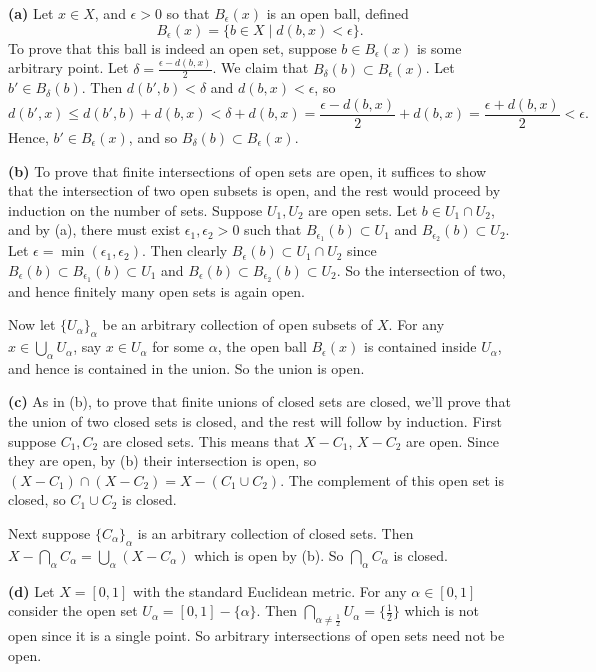 \documentclass[11pt,letterpaper]{article}
\begin{document}
\begin{changemargin}{1em}{1em}
    \textbf{(a)} Let $x\in X$, and $\epsilon > 0$ so that $B_\epsilon(x)$ is an open ball, defined
    \[
        B_\epsilon(x) = \{b\in X \mid d(b,x) < \epsilon\}
    .\] 
    To prove that this ball is indeed an open set, suppose $b\in B_\epsilon(x)$ is some arbitrary point. Let $\delta = \frac{\epsilon - d(b,x)}{2}$. We claim that $B_\delta(b)\subset B_\epsilon(x)$.
    Let $b'\in B_\delta(b)$. Then  $d(b', b)< \delta$ and  $d(b, x) < \epsilon$, so
     \[
        d(b', x)\leq d(b', b) + d(b, x) < \delta + d(b,x) = \frac{\epsilon - d(b,x)}{2} + d(b,x) = \frac{\epsilon + d(b,x)}{2} < \epsilon
    .\] 
    Hence, $b'\in B_\epsilon(x)$, and so  $B_{\delta}(b)\subset B_\epsilon(x)$.

    \textbf{(b)} To prove that finite intersections of open sets are open, it suffices to show that the intersection of two open subsets is open, and the rest would proceed by induction on the number of sets. 
    Suppose $U_1, U_2$ are open sets. Let $b\in U_1\cap U_2$, and by (a), there must exist $\epsilon_1, \epsilon_2 > 0$ such that $B_{\epsilon_1}(b)\subset U_1$ and $B_{\epsilon_2}(b)\subset U_2$. 
    Let  $\epsilon = \min(\epsilon_1, \epsilon_2)$. 
    Then clearly $B_\epsilon(b)\subset U_1\cap U_2$ since  $B_\epsilon(b)\subset B_{\epsilon_1}(b)\subset U_1$ and  $B_\epsilon(b)\subset B_{\epsilon_2}(b)\subset U_2$. 
    So the intersection of two, and hence finitely many open sets is again open.

    Now let $\{U_\alpha\}_\alpha$ be an arbitrary collection of open subsets of $X$. 
    For any $x\in \bigcup_{\alpha}U_\alpha$, say  $x\in U_\alpha$ for some $\alpha$, the open ball $B_\epsilon(x)$ is contained inside  $U_\alpha$, and hence is contained in the union. So the union is open.

    \textbf{(c)} As in (b), to prove that finite unions of closed sets are closed, we'll prove that the union of two closed sets is closed, and the rest will follow by induction. 
    First suppose $C_1, C_2$ are closed sets. This means that $X-C_1$, $X-C_2$ are open. Since they are open, by (b) their intersection is open, so $(X-C_1)\cap (X-C_2)= X-(C_1\cup C_2)$. 
    The complement of this open set is closed, so $C_1\cup C_2$ is closed. 

    Next suppose $\{C_\alpha\}_\alpha$ is an arbitrary collection of closed sets. Then $X-\bigcap_{\alpha} C_\alpha=\bigcup_\alpha(X-C_\alpha)$ which is open by (b). So  $\bigcap_\alpha C_\alpha$ is closed.

    \textbf{(d)} Let $X=[0,1]$ with the standard Euclidean metric. For any $\alpha\in [0,1]$ consider the open set  $U_\alpha = [0,1]-\{\alpha\}$. 
    Then  $\bigcap_{\alpha\neq \frac{1}{2}}U_\alpha=\{\frac{1}{2}\}$ which is not open since it is a single point. So arbitrary intersections of open sets need not be open.
\end{changemargin}
\end{document}
